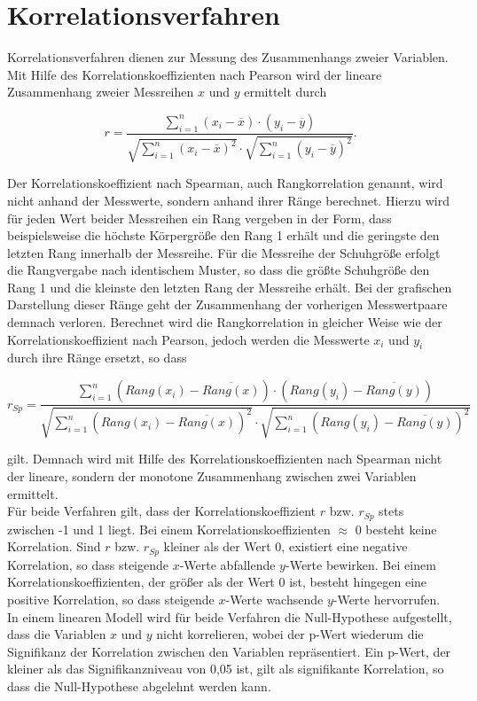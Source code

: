 \section{Korrelationsverfahren}

Korrelationsverfahren dienen zur Messung des Zusammenhangs zweier Variablen. Mit Hilfe des Korrelationskoeffizienten nach Pearson wird der lineare Zusammenhang zweier Messreihen $x$ und $y$ ermittelt durch

\begin{equation}
r =  \frac{\sum \limits_{i=1}^n (x_i-\overline{x}) \cdot (y_i-\overline{y})}{\sqrt{\sum \limits_{i=1}^n (x_i-\overline{x})^2} \cdot \sqrt{\sum \limits_{i=1}^n (y_i-\overline{y})^2}}.
	\label{eq:pearson}
\end{equation}

Der Korrelationskoeffizient nach Spearman, auch Rangkorrelation genannt, wird nicht anhand der Messwerte, sondern anhand ihrer Ränge berechnet. Hierzu wird für jeden Wert beider Messreihen ein Rang vergeben in der Form, dass beispielsweise die höchste Körpergröße den Rang 1 erhält und die geringste den letzten Rang innerhalb der Messreihe. Für die Messreihe der Schuhgröße erfolgt die Rangvergabe nach identischem Muster, so dass die größte Schuhgröße den Rang 1 und die kleinste den letzten Rang der Messreihe erhält. Bei der grafischen Darstellung dieser Ränge geht der Zusammenhang der vorherigen Messwertpaare demnach verloren. Berechnet wird die Rangkorrelation in gleicher Weise wie der Korrelationskoeffizient nach Pearson, jedoch werden die Messwerte $x_i$ und $y_i$ durch ihre Ränge ersetzt, so dass 

\begin{equation}
r_{Sp} =  \frac{\sum \limits_{i=1}^n (Rang(x_i)-\overline{Rang(x)}) \cdot (Rang(y_i)-\overline{Rang(y)})}{\sqrt{\sum \limits_{i=1}^n (Rang(x_i)-\overline{Rang(x)})^2} \cdot \sqrt{\sum \limits_{i=1}^n (Rang(y_i)-\overline{Rang(y)})^2}}
	\label{eq:spearman}
\end{equation}

gilt. Demnach wird mit Hilfe des Korrelationskoeffizienten nach Spearman nicht der lineare, sondern der monotone Zusammenhang zwischen zwei Variablen ermittelt. \parencite{frank_einfach_2006}\\

Für beide Verfahren gilt, dass der Korrelationskoeffizient $r$ bzw. $r_{Sp}$ stets zwischen -1 und 1 liegt. Bei einem Korrelationskoeffizienten $\approx$ 0 besteht keine Korrelation. Sind $r$ bzw. $r_{Sp}$ kleiner als der Wert 0, existiert eine negative Korrelation, so dass steigende $x$-Werte abfallende $y$-Werte bewirken. Bei einem Korrelationskoeffizienten, der größer als der Wert 0 ist, besteht hingegen eine positive Korrelation, so dass steigende $x$-Werte wachsende $y$-Werte hervorrufen. In einem linearen Modell wird für beide Verfahren die Null-Hypothese aufgestellt, dass die Variablen $x$ und $y$ nicht korrelieren, wobei der p-Wert wiederum die Signifikanz der Korrelation zwischen den Variablen repräsentiert. Ein p-Wert, der kleiner als das Signifikanzniveau von 0,05 ist, gilt als signifikante Korrelation, so dass die Null-Hypothese abgelehnt werden kann. \parencite{frank_einfach_2006}\\

